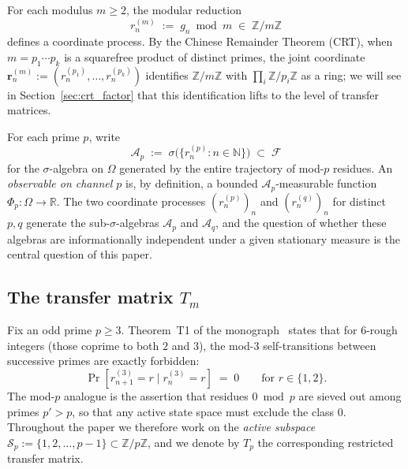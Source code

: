 For each modulus $m \geq 2$, the modular reduction
\begin{equation}
  r_n^{(m)} \;:=\; g_n \bmod m \;\in\; \mathbb{Z}/m\mathbb{Z}
  \label{eq:residue_def}
\end{equation}
defines a coordinate process. By the Chinese Remainder Theorem (CRT),
when $m = p_1 \cdots p_k$ is a squarefree product of distinct primes,
the joint coordinate
$\mathbf{r}_n^{(m)} := (r_n^{(p_1)}, \ldots, r_n^{(p_k)})$ identifies
$\mathbb{Z}/m\mathbb{Z}$ with $\prod_i \mathbb{Z}/p_i\mathbb{Z}$ as a
ring; we will see in Section~\ref{sec:crt_factor} that this
identification lifts to the level of transfer matrices.

For each prime $p$, write
\begin{equation}
  \mathcal{A}_p \;:=\; \sigma\!\bigl(\{r_n^{(p)} : n \in \mathbb{N}\}\bigr)
  \;\subset\; \mathcal{F}
  \label{eq:Ap_def}
\end{equation}
for the $\sigma$-algebra on $\Omega$ generated by the entire trajectory
of mod-$p$ residues. An \emph{observable on channel $p$} is, by
definition, a bounded $\mathcal{A}_p$-measurable function
$\Phi_p : \Omega \to \mathbb{R}$. The two coordinate processes
$(r_n^{(p)})_n$ and $(r_n^{(q)})_n$ for distinct $p, q$ generate the
sub-$\sigma$-algebras $\mathcal{A}_p$ and $\mathcal{A}_q$, and the
question of whether these algebras are informationally independent
under a given stationary measure is the central question of this
paper.

\subsection{The transfer matrix $T_m$}
\label{ssec:transfer_matrix}

Fix an odd prime $p \geq 3$. Theorem~T1 of the
monograph~\cite[ch.~1]{PT_Monograph} states that for $6$-rough integers
(those coprime to both $2$ and $3$), the mod-$3$ self-transitions
between successive primes are exactly forbidden:
\begin{equation}
  \Pr[r_{n+1}^{(3)} = r \mid r_n^{(3)} = r] \;=\; 0
  \qquad \text{for } r \in \{1, 2\}.
  \label{eq:T1}
\end{equation}
The mod-$p$ analogue is the assertion that residues $0 \bmod p$ are
sieved out among primes $p' > p$, so that any active state space must
exclude the class $0$. Throughout the paper we therefore work on the
\emph{active subspace}
$\mathcal{S}_p := \{1, 2, \ldots, p-1\} \subset \mathbb{Z}/p\mathbb{Z}$,
and we denote by $T_p$ the corresponding restricted transfer matrix.

